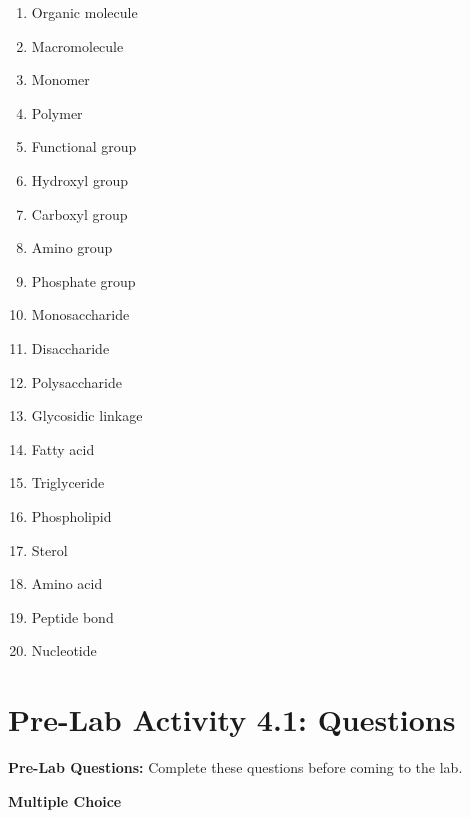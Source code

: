\documentclass[
  letterpaper,
  DIV=11,
  numbers=noendperiod]{scrreprt}
\begin{document}
\begin{enumerate}
\def\labelenumi{\arabic{enumi}.}
\item
  Organic molecule
\item
  Macromolecule
\item
  Monomer
\item
  Polymer
\item
  Functional group
\item
  Hydroxyl group
\item
  Carboxyl group
\item
  Amino group
\item
  Phosphate group
\item
  Monosaccharide
\item
  Disaccharide
\item
  Polysaccharide
\item
  Glycosidic linkage
\item
  Fatty acid
\item
  Triglyceride
\item
  Phospholipid
\item
  Sterol
\item
  Amino acid
\item
  Peptide bond
\item
  Nucleotide
\end{enumerate}

\section{\texorpdfstring{\textbf{Pre-Lab Activity 4.1:
Questions}}{Pre-Lab Activity 4.1: Questions}}\label{pre-lab-activity-4.1-questions-1}

\textbf{Pre-Lab Questions:} Complete these questions before coming to
the lab.

\textbf{Multiple Choice}
\end{document}
